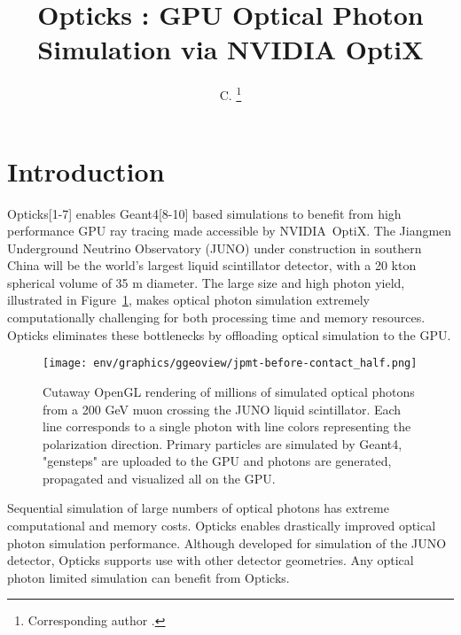 \documentclass{webofc}
\begin{document}
\title{Opticks : GPU Optical Photon Simulation via NVIDIA OptiX}
\author{ C. \fnsep\thanks{Corresponding author .}}
\abstract{}
\maketitle
%
\section{Introduction}%
\label{intro}
%
Opticks[1-7] enables Geant4[8-10] based simulations 
to benefit from high performance GPU ray tracing made accessible 
by NVIDIA\textregistered\ OptiX\texttrademark[11-15].
%
The Jiangmen Underground Neutrino Observatory (JUNO)\cite{juno} 
under construction in southern China will be the world's largest liquid scintillator detector, 
with a 20 kton spherical volume of 35 m diameter. The large size and high photon yield, illustrated in Figure~\ref{problem}, 
makes optical photon simulation extremely computationally challenging for both processing time and memory resources. 
Opticks eliminates these bottlenecks by offloading optical simulation to the GPU. 
%
%
\begin{figure}
\centering
\texttt{[image: env/graphics/ggeoview/jpmt-before-contact\_half.png]}
\caption{Cutaway OpenGL rendering of millions of simulated optical photons from a 200 GeV muon crossing the JUNO liquid scintillator. 
Each line corresponds to a single photon with line colors representing the polarization direction. 
Primary particles are simulated by Geant4, "gensteps" are uploaded to the GPU and photons are generated, propagated
and visualized all on the GPU. 
}
\label{problem}
\vspace{-5mm}
\end{figure}%
%
Sequential simulation of large numbers of 
optical photons has extreme computational and memory costs. 
Opticks enables drastically improved optical photon simulation performance.
%
Although developed for simulation of the JUNO detector, Opticks
supports use with other detector geometries. 
Any optical photon limited simulation can benefit from Opticks.
\end{document}
